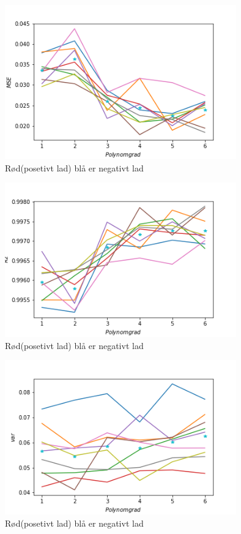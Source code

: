 \documentclass[norsk,a4paper,12pt]{article}
\begin{document}
\begin{figure}[H]
\includegraphics[width=100mm]{MSE}
\caption{Rød(posetivt lad)  blå er negativt lad  }
\end{figure}


\begin{figure}[H]
\includegraphics[width=100mm]{R2}
\caption{Rød(posetivt lad)  blå er negativt lad  }
\end{figure}

\begin{figure}[H]
\includegraphics[width=100mm]{var}
\caption{Rød(posetivt lad)  blå er negativt lad  }
\end{figure}
\end{document}
